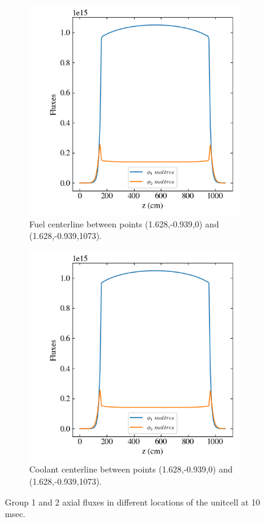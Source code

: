 \documentclass[11pt,letterpaper]{article}
\begin{document}
	\begin{figure}[htbp!]
		\centering
		\begin{subfigure}[t]{0.4\textwidth}
			\centering
			\includegraphics[width=\linewidth]{3D-unitcell-reflec1}
			\caption{Fuel centerline between points (1.628,-0.939,0) and (1.628,-0.939,1073).}
		\end{subfigure}
		\begin{subfigure}[t]{0.4\textwidth}
			\centering
			\includegraphics[width=\linewidth]{3D-unitcell-reflec2}
			\caption{Coolant centerline between points (1.628,-0.939,0) and (1.628,-0.939,1073).}
		\end{subfigure}
		\hfill
		\caption{Group 1 and 2 axial fluxes in different locations of the unitcell at 10 msec.}
		\label{fig:3D-unitcell-reflec1}
	\end{figure}
\end{document}
